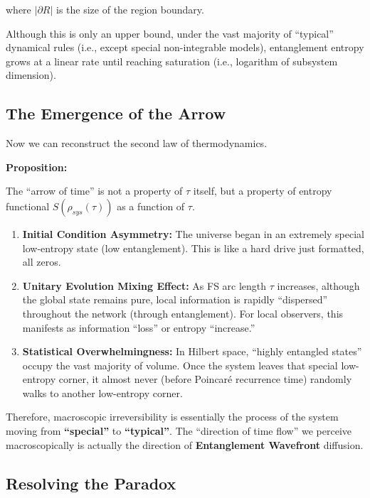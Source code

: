 where $|\partial R|$ is the size of the region boundary.

Although this is only an upper bound, under the vast majority of ``typical'' dynamical rules (i.e., except special non-integrable models), entanglement entropy grows at a linear rate until reaching saturation (i.e., logarithm of subsystem dimension).

\subsection{The Emergence of the Arrow}

Now we can reconstruct the second law of thermodynamics.

\textbf{Proposition:}

The ``arrow of time'' is not a property of $\tau$ itself, but a property of entropy functional $S(\rho_{sys}(\tau))$ as a function of $\tau$.

\begin{enumerate}
\item \textbf{Initial Condition Asymmetry:} The universe began in an extremely special low-entropy state (low entanglement). This is like a hard drive just formatted, all zeros.

\item \textbf{Unitary Evolution Mixing Effect:} As FS arc length $\tau$ increases, although the global state remains pure, local information is rapidly ``dispersed'' throughout the network (through entanglement). For local observers, this manifests as information ``loss'' or entropy ``increase.''

\item \textbf{Statistical Overwhelmingness:} In Hilbert space, ``highly entangled states'' occupy the vast majority of volume. Once the system leaves that special low-entropy corner, it almost never (before Poincaré recurrence time) randomly walks to another low-entropy corner.
\end{enumerate}

Therefore, macroscopic irreversibility is essentially the process of the system moving from \textbf{``special''} to \textbf{``typical''}. The ``direction of time flow'' we perceive macroscopically is actually the direction of \textbf{Entanglement Wavefront} diffusion.

\subsection{Resolving the Paradox}


